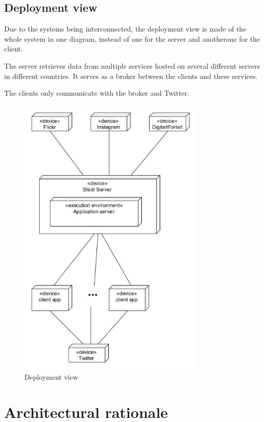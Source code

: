 \documentclass[11pt]{book}
\begin{document}
\subsection{Deployment view}
Due to the systems being interconnected, the deployment view is made of the whole system in one diagram, instead of one for the server and anotherone for the client.

The server retrieves data from multiple services hosted on several different servers in different countries. It serves as a broker between the clients and these services.

The clients only communicate with the broker and Twitter.

\begin{figure}[H]
      \centering
      \includegraphics[width=0.8\textwidth]{Figures/Architecture/deploymentView.jpg}
      \caption{Deployment view}
      \label{fig:arch_deployment}
\end{figure}

\section{Architectural rationale}
\end{document}
